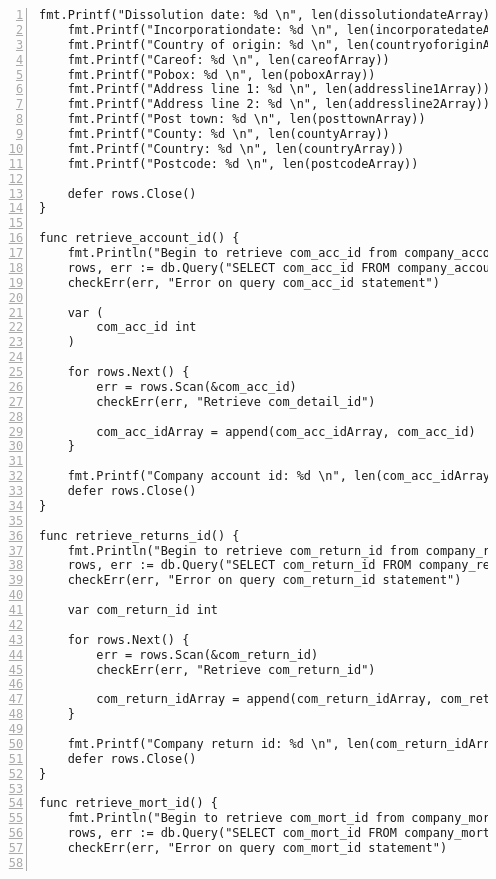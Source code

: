 \begin{lstlisting}[breaklines, frame=single, numbers=left, caption={Resource Table Key Retrieval Function.}, label=commandline-02]
	fmt.Printf("Dissolution date: %d \n", len(dissolutiondateArray))
	fmt.Printf("Incorporationdate: %d \n", len(incorporatedateArray))
	fmt.Printf("Country of origin: %d \n", len(countryoforiginArray))
	fmt.Printf("Careof: %d \n", len(careofArray))
	fmt.Printf("Pobox: %d \n", len(poboxArray))
	fmt.Printf("Address line 1: %d \n", len(addressline1Array))
	fmt.Printf("Address line 2: %d \n", len(addressline2Array))
	fmt.Printf("Post town: %d \n", len(posttownArray))
	fmt.Printf("County: %d \n", len(countyArray))
	fmt.Printf("Country: %d \n", len(countryArray))
	fmt.Printf("Postcode: %d \n", len(postcodeArray))    
	
	defer rows.Close()
}

func retrieve_account_id() {	
	fmt.Println("Begin to retrieve com_acc_id from company_account")
	rows, err := db.Query("SELECT com_acc_id FROM company_account;")
	checkErr(err, "Error on query com_acc_id statement")
	
	var ( 
		com_acc_id int 
	)
	
	for rows.Next() {
		err = rows.Scan(&com_acc_id)
		checkErr(err, "Retrieve com_detail_id")
		
		com_acc_idArray = append(com_acc_idArray, com_acc_id) 
	}
	
	fmt.Printf("Company account id: %d \n", len(com_acc_idArray))
	defer rows.Close()
}

func retrieve_returns_id() {	
	fmt.Println("Begin to retrieve com_return_id from company_returns")
	rows, err := db.Query("SELECT com_return_id FROM company_returns AS return JOIN company_rawdata AS raw ON raw.return_nextduedate = return.com_return_nextduedate AND raw.return_lastmadeupdate = return.com_return_lastmadeupdate;")
	checkErr(err, "Error on query com_return_id statement")
	
	var com_return_id int 
	
	for rows.Next() {
		err = rows.Scan(&com_return_id)
		checkErr(err, "Retrieve com_return_id")
		
		com_return_idArray = append(com_return_idArray, com_return_id) 
	}
	
	fmt.Printf("Company return id: %d \n", len(com_return_idArray))
	defer rows.Close()
}

func retrieve_mort_id() {	
	fmt.Println("Begin to retrieve com_mort_id from company_mortgages")
	rows, err := db.Query("SELECT com_mort_id FROM company_mortgages AS mort JOIN company_rawdata AS raw ON mort.com_num_mortchanges = raw.nummortcharges AND mort.com_num_mortoutstanding = raw.nummortoutstanding AND mort.com_num_mortpartsatisfied = raw.nummortpartsatisfied AND mort.com_num_mortsatisfied = raw.nummortsatisfied;")
	checkErr(err, "Error on query com_mort_id statement")
	

\end{lstlisting}
